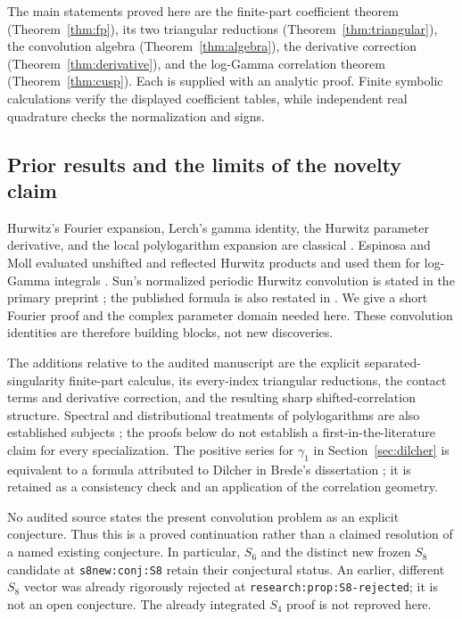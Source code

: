 \documentclass[11pt]{article}
\numberwithin{equation}{section}
\theoremstyle{definition}\newtheorem{definition}[theorem]{Definition}
\theoremstyle{remark}\newtheorem{remark}[theorem]{Remark}
\begin{document}
The main statements proved here are the finite-part coefficient theorem
(Theorem~\ref{thm:fp}), its two triangular reductions
(Theorem~\ref{thm:triangular}), the convolution algebra
(Theorem~\ref{thm:algebra}), the derivative correction
(Theorem~\ref{thm:derivative}), and the log-Gamma correlation theorem
(Theorem~\ref{thm:cusp}). Each is supplied with an analytic proof. Finite
symbolic calculations verify the displayed coefficient tables, while
independent real quadrature checks the normalization and signs.

\subsection{Prior results and the limits of the novelty claim}

Hurwitz's Fourier expansion, Lerch's gamma identity, the Hurwitz
parameter derivative, and the local polylogarithm expansion are classical
\cite{DLMFHurwitz,DLMFPolylog}. Espinosa and Moll evaluated unshifted and
reflected Hurwitz products and used them for log-Gamma integrals
\cite[Theorem 3.1 and Section 6]{EspinosaMoll}. Sun's normalized periodic
Hurwitz convolution is stated in the primary preprint
\cite[Remark 3.2]{Sun}; the published formula is also restated in
\cite[Theorem 1.6]{ZhuHuKim}. We give a short Fourier proof and the complex
parameter domain needed here. These convolution identities are therefore
building blocks, not new discoveries.

The additions relative to the audited manuscript are the explicit
separated-singularity finite-part calculus, its every-index triangular
reductions, the contact terms and derivative correction, and the resulting
sharp shifted-correlation structure. Spectral and distributional treatments
of polylogarithms are also established subjects \cite{GaySebbar}; the
proofs below do not establish a first-in-the-literature claim for every
specialization. The positive series for $\gamma_1$ in
Section~\ref{sec:dilcher} is equivalent to a formula attributed to Dilcher
in Brede's dissertation \cite{Dilcher,Brede}; it is retained as a consistency
check and an application of the correlation geometry.

No audited source states the present convolution problem as an explicit
conjecture. Thus this is a proved continuation rather than a claimed
resolution of a named existing conjecture. In particular, $S_6$ and the
distinct new frozen $S_8$ candidate at \texttt{s8new:conj:S8} retain their
conjectural status. An earlier, different $S_8$ vector was already
rigorously rejected at \texttt{research:prop:S8-rejected}; it is not an
open conjecture. The already integrated $S_4$ proof is not reproved here.
\end{document}

